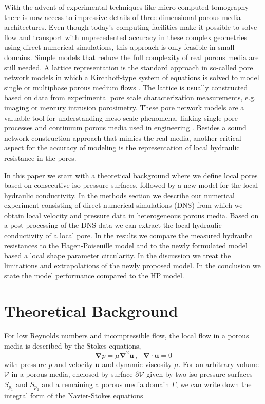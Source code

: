 \documentclass[draft]{agujournal2019}
\begin{document}
With the advent of experimental techniques like micro-computed tomography there is now access to impressive details of three dimensional porous media architectures. Even though today’s computing facilities make it possible to solve flow and transport with unprecedented accuracy in these complex geometries using direct numerical simulations, this approach is only feasible in small domains. Simple models that reduce the full complexity of real porous media are still needed. A lattice representation is the standard approach in so-called pore network models in which a Kirchhoff-type system of equations is solved to model single or multiphase porous medium flows . The lattice is usually constructed based on data from experimental pore scale characterization measurements, e.g. imaging or mercury intrusion porosimetry. These pore network models are a valuable tool for understanding meso-scale phenomena, linking single pore processes and continuum porous media used in engineering . Besides a sound network construction approach that mimics the real media, another critical aspect for the accuracy of modeling is the representation of local hydraulic resistance in the pores. 


In this paper we start with a theoretical background where we define local pores based on consecutive iso-pressure surfaces, followed by a new model for the local hydraulic conductivity. In the methods section we describe our numerical experiment consisting of direct numerical simulations (DNS) from which we obtain local velocity and pressure data in heterogeneous porous media. Based on a post-processing of the DNS data we can extract the local hydraulic conductivity of a local pore. In the results we compare the measured hydraulic resistances to the Hagen-Poiseuille model and to the newly formulated model based a local shape parameter circularity. In the discussion we treat the limitations and extrapolations of the newly proposed model. In the conclusion we state the model performance compared to the HP model.



\section{Theoretical Background}

For low Reynolds numbers and incompressible flow, the local flow in a porous media is described by the Stokes equations,
\begin{equation}
	\mathbf{\nabla} p =  \mu\mathbf{\nabla}^2 \mathbf{u}\,,~~~\mathbf{\nabla}\cdot\mathbf{u}=0\label{eq:stokes_local}
	\end{equation}
with pressure $p$ and velocity $\mathbf{u}$ and dynamic viscosity $\mu$. For an arbitrary volume $\mathcal{V}$ in a porous media, enclosed by surface $\partial \mathcal{V}$ given by two iso-pressure surfaces $S_{p_1}$ and $S_{p_2}$ and a remaining a porous media domain $\Gamma$, we can write down the integral form of the Navier-Stokes equations
{}
\end{document}
